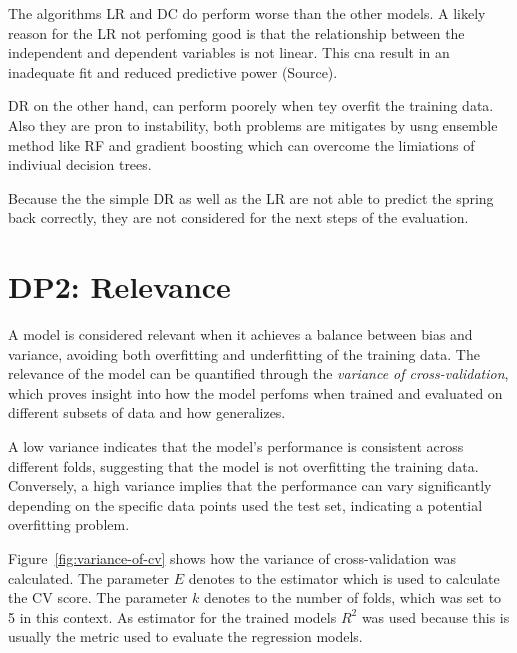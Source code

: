 
The algorithms \ac{LR} and {DC} do perform worse than the other models.
A likely reason for the \ac{LR} not perfoming good is that the relationship between the
independent and dependent variables is not linear. This cna result in an inadequate fit
and reduced predictive power (Source).

\ac{DR} on the other hand, can perform poorely when tey overfit the training data.
Also they are pron to instability, both problems are mitigates by usng ensemble method
like \ac{RF} and gradient boosting which can overcome the limiations of indiviual
decision trees.

Because the the simple \ac{DR} as well as the \ac{LR} are not able to predict the
spring back correctly, they are not considered for the next steps of the evaluation.


\section{DP2: Relevance}\label{sec:relevance}

A model is considered relevant when it achieves a balance between bias and
variance, avoiding
both overfitting and underfitting of the training data.
The relevance of the model can be quantified through the \textit{variance of
cross-validation},
which proves insight into how the model perfoms when trained and evaluated on
different subsets
of data and how generalizes.

A low variance indicates that the model's performance is consistent across
different folds,
suggesting that the model is not overfitting the training data.
Conversely, a high variance implies that the performance can vary
significantly depending on the
specific data points used the test set, indicating a potential overfitting
problem.

Figure~\ref{fig:variance-of-cv} shows how the variance of cross-validation
was calculated.
The parameter \(E\) denotes to the estimator which is used to calculate the
\ac{CV} score.
The parameter \(k\) denotes to the number of folds, which was set to 5 in this
context.
As estimator for the trained models \(R^2\) was used because this is usually
the metric used to
evaluate the regression models.


